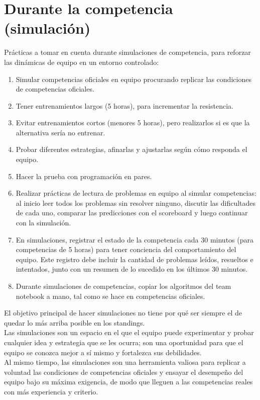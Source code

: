 \section{Durante la competencia (simulación)}
Prácticas a tomar en cuenta durante simulaciones de competencia, para reforzar las dinámicas de equipo en un entorno controlado:
\begin{enumerate}[resume=icpc]
    \item Simular competencias oficiales en equipo procurando replicar las condiciones de competencias oficiales.
    \item Tener entrenamientos largos (5 horas), para incrementar la resistencia.
    \item Evitar entrenamientos cortos (menores 5 horas), pero realizarlos si es que la alternativa sería no entrenar.
    \item Probar diferentes estrategias, afinarlas y ajustarlas según cómo responda el equipo.
    \item Hacer la prueba con programación en pares.
    \item Realizar prácticas de lectura de problemas en equipo al simular competencias: al inicio leer todos los problemas sin resolver ninguno, discutir las dificultades de cada uno, comparar las predicciones con el scoreboard y luego continuar con la simulación.
    \item En simulaciones, registrar el estado de la competencia cada 30 minutos (para competencias de 5 horas) para tener conciencia del comportamiento del equipo. Este registro debe incluir la cantidad de problemas leídos, resueltos e intentados, junto con un resumen de lo sucedido en los últimos 30 minutos.
    \item Durante simulaciones de competencias, copiar los algoritmos del team notebook a mano, tal como se hace en competencias oficiales.
\end{enumerate}
El objetivo principal de hacer simulaciones no tiene por qué ser siempre el de quedar lo más arriba posible en los standings.\\

Las simulaciones son un espacio en el que el equipo puede experimentar y probar cualquier idea y estrategia que se les ocurra; son una oportunidad para que el equipo se conozca mejor a sí mismo y fortalezca sus debilidades.\\

Al mismo tiempo, las simulaciones son una herramienta valiosa para replicar a voluntad las condiciones de competencias oficiales y ensayar el desempeño del equipo bajo su máxima exigencia, de modo que lleguen a las competencias reales con más experiencia y criterio.
\pagebreak
